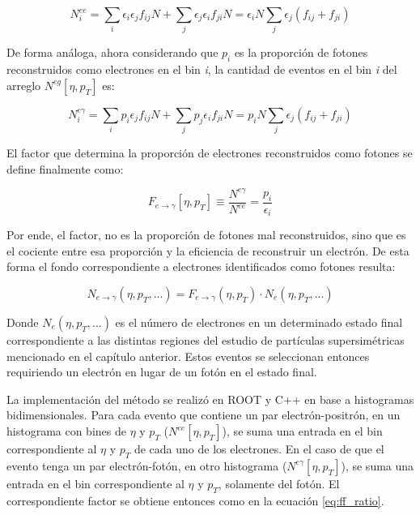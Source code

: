 \begin{equation}
N_{i}^{ee} = \sum_{i}\epsilon_{i}\epsilon_{j}f_{ij}N + \sum_{j}\epsilon_{j}\epsilon_{i}f_{ji}N = \epsilon_{i}N\sum_{j}\epsilon_{j}(f_{ij}+f_{ji})
\end{equation}

De forma análoga, ahora considerando que $p_{i}$ es la proporción de fotones reconstruidos como electrones en el bin \textit{i}, la cantidad de eventos en el bin \textit{i} del arreglo $N^{eg}[\eta , p_{T}]$ es:

\begin{equation}
N_{i}^{e\gamma} = \sum_{i}p_{i}\epsilon_{j}f_{ij}N + \sum_{j}p_{j}\epsilon_{i}f_{ji}N = p_{i}N\sum_{j}\epsilon_{j}(f_{ij}+f_{ji})
\end{equation}

El factor que determina la proporción de electrones reconstruidos como fotones se define finalmente como:

\begin{equation}
F_{e\rightarrow\gamma}[\eta , p_{T}]\equiv\frac{N^{e\gamma}}{N^{ee}}=\frac{p_{i}}{\epsilon_{i}}
\end{equation}

Por ende, el factor, no es la proporción de fotones mal reconstruidos, sino que es el cociente entre esa proporción y la eficiencia de reconstruir un electrón. De esta forma el fondo correspondiente a electrones identificados como fotones resulta:

\begin{equation}
N_{e\rightarrow\gamma}(\eta , p_{T} , ... ) = F_{e\rightarrow\gamma}(\eta , p_{T})\cdot N_{e}(\eta , p_{T} , ...)
\end{equation}
	
Donde $N_{e}(\eta , p_{T} , ...)$ es el número de electrones en un determinado estado final correspondiente a las distintas regiones del estudio de partículas supersimétricas mencionado en el capítulo anterior. Estos eventos se seleccionan entonces requiriendo un electrón en lugar de un fotón en el estado final. 

La implementación del método se realizó en ROOT y C++ en base a histogramas bidimensionales. Para cada evento que contiene un par electrón-positrón, en un histograma con bines de $\eta$ y $p_{T}$ ($N^{ee}[\eta , p_{T}]$), se suma una entrada en el bin correspondiente al $\eta$ y $p_{T}$ de cada uno de los electrones. En el caso de que el evento tenga un par electrón-fotón, en otro histograma ($N^{e\gamma}[\eta , p_{T}]$), se suma una entrada en el bin correspondiente al $\eta$ y $p_{T}$, solamente del fotón. El correspondiente factor se obtiene entonces como en la ecuación \ref{eq:ff_ratio}.

